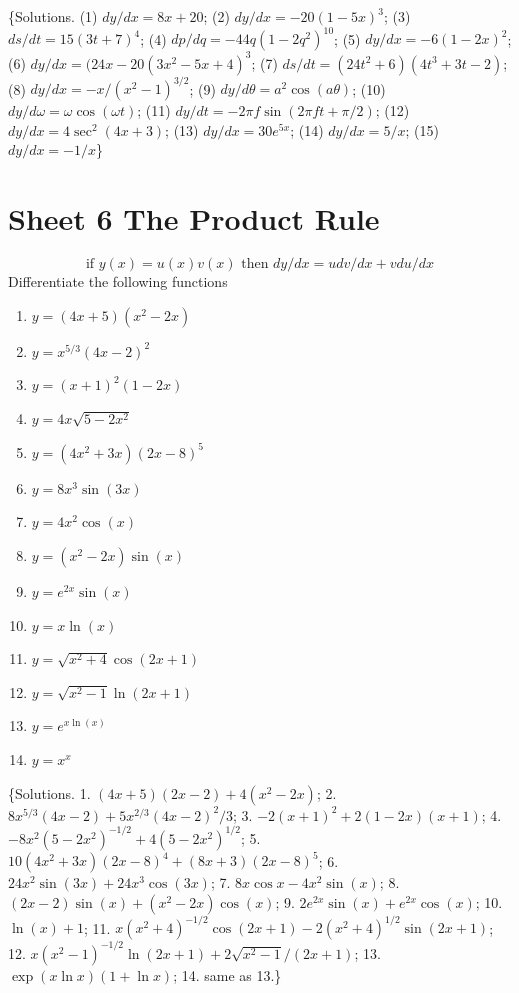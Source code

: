 \documentclass[
  english,
  11pt,
  oneside]{book}
\providecommand{\tightlist}{%
  \setlength{\itemsep}{0pt}\setlength{\parskip}{0pt}}
\newcommand{\slide}{}
\theoremstyle{definition}
\theoremstyle{definition}
\theoremstyle{definition}
\theoremstyle{definition}
\theoremstyle{remark}
\begin{document}
\slide

\{Solutions. (1) \(dy/dx=8x+20\); (2) \(dy/dx=-20(1-5x)^3\); (3) \(ds/dt=15(3t+7)^4\); (4) \(dp/dq=-44q(1-2q^2)^{10}\); (5) \(dy/dx=-6(1-2x)^2\); (6) \(dy/dx=(24x-20(3x^2-5x+4)^3\); (7) \(ds/dt=(24t^2+6)(4t^3+3t-2)\); (8) \(dy/dx=-x/(x^2-1)^{3/2}\); (9) \(dy/d\theta=a^2\cos(a\theta)\); (10) \(dy/d\omega=\omega\cos(\omega t)\); (11) \(dy/dt=-2\pi f\sin(2\pi ft+\pi/2)\); (12) \(dy/dx=4\sec^2(4x+3)\); (13) \(dy/dx=30e^{5x}\); (14) \(dy/dx=5/x\); (15) \(dy/dx=-1/x\)\}
\slide

\section{Sheet 6 The Product Rule}\label{sheet-6-the-product-rule}

\[\text{if }y(x)=u(x)v(x)\text{ then }dy/dx=udv/dx+vdu/dx\]
Differentiate the following functions

\begin{enumerate}
\def\labelenumi{\arabic{enumi}.}
\tightlist
\item
  \(y=(4x+5)(x^2-2x)\)
\item
  \(y=x^{5/3}(4x-2)^2\)
\item
  \(y=(x+1)^2(1-2x)\)
\item
  \(y=4x\sqrt{5-2x^2}\)
\item
  \(y=(4x^2+3x)(2x-8)^5\)
\item
  \(y=8x^3\sin(3x)\)
\item
  \(y=4x^2\cos(x)\)
\item
  \(y=(x^2-2x)\sin(x)\)
\item
  \(y=e^{2x}\sin(x)\)
\item
  \(y=x\ln(x)\)
\item
  \(y=\sqrt{x^2+4}\cos(2x+1)\)
\item
  \(y=\sqrt{x^2-1}\ln(2x+1)\)
\item
  \(y=e^{x\ln(x)}\)
\item
  \(y=x^x\)
\end{enumerate}

\slide

\{Solutions. 1. \((4x+5)(2x-2)+4(x^2-2x)\); 2. \(8x^{5/3}(4x-2)+5x^{2/3}(4x-2)^2/3\); 3. \(-2(x+1)^2+2(1-2x)(x+1)\); 4. \(-8x^2(5-2x^2)^{-1/2}+4(5-2x^2)^{1/2}\); 5. \(10(4x^2+3x)(2x-8)^4+(8x+3)(2x-8)^5\); 6. \(24x^2\sin(3x)+24x^3\cos(3x)\); 7. \(8x\cos x-4x^2\sin(x)\); 8. \((2x-2)\sin(x)+(x^2-2x)\cos(x)\); 9. \(2e^{2x}\sin(x)+e^{2x}\cos(x)\); 10. \(\ln(x)+1\); 11. \(x(x^2+4)^{-1/2}\cos(2x+1)-2(x^2+4)^{1/2}\sin(2x+1)\); 12. \(x(x^2-1)^{-1/2}\ln(2x+1)+2\sqrt{x^2-1}/(2x+1)\); 13. \(\exp(x\ln x)(1+\ln x)\); 14. same as 13.\}
\slide
\end{document}
